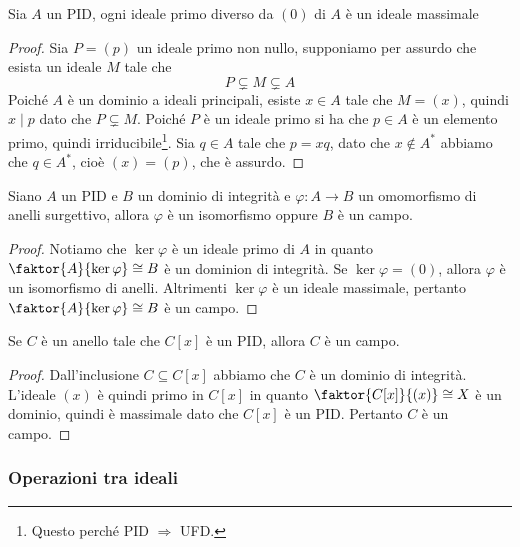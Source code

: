 \documentclass[11pt]{scrartcl}
\begin{document}
\begin{proposition}
    Sia $A$ un PID, ogni ideale primo diverso da $(0)$ di $A$ è un ideale 
    massimale
\end{proposition}

\begin{proof}
    Sia $P = (p)$ un ideale primo non nullo, supponiamo per assurdo che esista
    un ideale $M$ tale che 
    \[
        P \subsetneq M \subsetneq A
    \]
    Poiché $A$ è un dominio a ideali principali, esiste $x \in A$ tale che 
    $M = (x)$, quindi $x \mid p$ dato che $P \subsetneq M$. Poiché $P$ è 
    un ideale primo si ha che $p \in A$ è un elemento primo, quindi 
    irriducibile\footnote{
        Questo perché PID $\Longrightarrow$ UFD.
    }. Sia $q \in A$ tale che $p = xq$, dato che $x \notin A^*$ abbiamo che 
    $q \in A^*$, cioè $(x) = (p)$, che è assurdo.
\end{proof}

\begin{corollary}
    Siano $A$ un PID e $B$ un dominio di integrità e $\varphi: A \longrightarrow B$
    un omomorfismo di anelli surgettivo, allora $\varphi$ è un isomorfismo
    oppure $B$ è un campo. 
\end{corollary}

\begin{proof}
    Notiamo che $\ker \varphi$ è un ideale primo di $A$ in quanto $\faktor{A}{\ker\varphi}
    \cong B$ è un dominion di integrità. Se $\ker\varphi = (0)$, allora 
    $\varphi$ è un isomorfismo di anelli. Altrimenti $\ker\varphi$ è un ideale
    massimale, pertanto $\faktor{A}{\ker\varphi}\cong B$ è un campo.
\end{proof}

\begin{corollary}
    Se $C$ è un anello tale che $C[x]$ è un PID, allora $C$ è un campo.
\end{corollary}

\begin{proof}
    Dall'inclusione $C \subseteq C[x]$ abbiamo che $C$ è un dominio di integrità.
    L'ideale $(x)$ è quindi primo in $C[x]$ in quanto $\faktor{C[x]}{(x)} \cong X$
    è un dominio, quindi è massimale dato che $C[x]$ è un PID. Pertanto 
    $C$ è un campo.
\end{proof}

\newpage

\subsubsection{Operazioni tra ideali}
\end{document}
